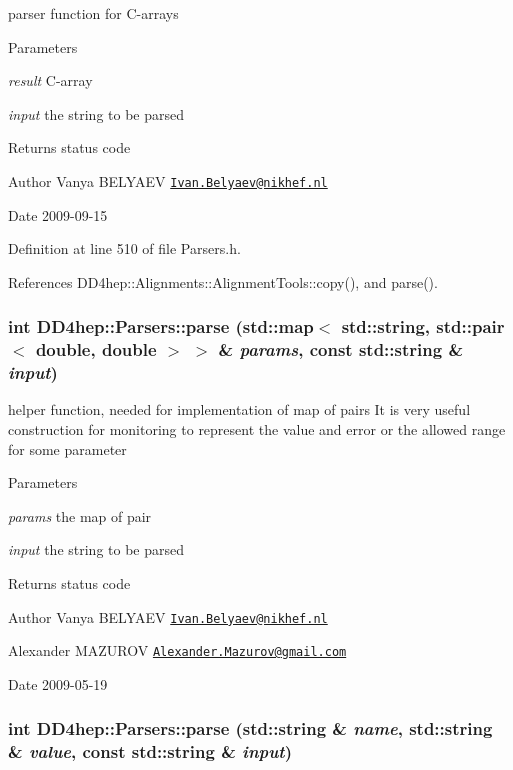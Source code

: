 parser function for C-\/arrays 
\begin{DoxyParams}{Parameters}
\item[{\em result}]C-\/array \item[{\em input}]the string to be parsed \end{DoxyParams}
\begin{DoxyReturn}{Returns}
status code 
\end{DoxyReturn}
\begin{DoxyAuthor}{Author}
Vanya BELYAEV \href{mailto:Ivan.Belyaev@nikhef.nl}{\tt Ivan.Belyaev@nikhef.nl} 
\end{DoxyAuthor}
\begin{DoxyDate}{Date}
2009-\/09-\/15 
\end{DoxyDate}


Definition at line 510 of file Parsers.h.

References DD4hep::Alignments::AlignmentTools::copy(), and parse().\hypertarget{namespace_d_d4hep_1_1_parsers_a2af85c2e9ae2c5ec0e91d3e992d529c2}{
\subsubsection[{parse}]{\setlength{\rightskip}{0pt plus 5cm}int DD4hep::Parsers::parse (std::map$<$ std::string, std::pair$<$ double, double $>$ $>$ \& {\em params}, \/  const std::string \& {\em input})}}
\label{namespace_d_d4hep_1_1_parsers_a2af85c2e9ae2c5ec0e91d3e992d529c2}


helper function, needed for implementation of map of pairs It is very useful construction for monitoring to represent the value and error or the allowed range for some parameter 
\begin{DoxyParams}{Parameters}
\item[{\em params}]the map of pair \item[{\em input}]the string to be parsed \end{DoxyParams}
\begin{DoxyReturn}{Returns}
status code 
\end{DoxyReturn}
\begin{DoxyAuthor}{Author}
Vanya BELYAEV \href{mailto:Ivan.Belyaev@nikhef.nl}{\tt Ivan.Belyaev@nikhef.nl} 

Alexander MAZUROV \href{mailto:Alexander.Mazurov@gmail.com}{\tt Alexander.Mazurov@gmail.com} 
\end{DoxyAuthor}
\begin{DoxyDate}{Date}
2009-\/05-\/19 
\end{DoxyDate}
\hypertarget{namespace_d_d4hep_1_1_parsers_a62f00a034a77a322187e7cd94418f696}{
\subsubsection[{parse}]{\setlength{\rightskip}{0pt plus 5cm}int DD4hep::Parsers::parse (std::string \& {\em name}, \/  std::string \& {\em value}, \/  const std::string \& {\em input})}}
\label{namespace_d_d4hep_1_1_parsers_a62f00a034a77a322187e7cd94418f696}


